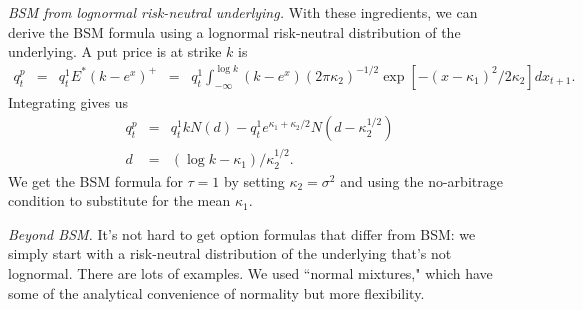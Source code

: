 \documentclass[11pt]{article}
\begin{document}

{\it BSM from lognormal risk-neutral underlying.\/}
With these ingredients, we can derive the BSM formula using
a lognormal risk-neutral distribution of the underlying.
A put price is at strike $k$ is
\begin{eqnarray*}
    q^p_t &=& q^1_t  E^* (k-e^{x})^+
          \;\;=\;\;  q^1_t  \int_{-\infty}^{\log k}
          (k-e^{x}) (2 \pi \kappa_2)^{-1/2}
          \exp[ - (x - \kappa_1)^2/2 \kappa_2] d x_{t+1} .
\end{eqnarray*}
Integrating gives us
\begin{eqnarray*}
    q^p_t &=& q^1_t k N(d) - q^1_t e^{\kappa_1 + \kappa_2/2} N(d-\kappa_2^{1/2}) \\
    d &=& (\log k - \kappa_1)/\kappa_2^{1/2} .
\end{eqnarray*}
We get the BSM formula for $\tau=1$ by setting $\kappa_2 = \sigma^2$
and using the no-arbitrage condition to substitute for the mean $\kappa_1$.


{\it Beyond BSM.\/}
It's not hard to get option formulas that differ from BSM:
we simply start with a risk-neutral distribution of the underlying
that's not lognormal.
There are lots of examples.
We used ``normal mixtures,"
which have some of the analytical convenience of normality
but more flexibility.



\end{document}
